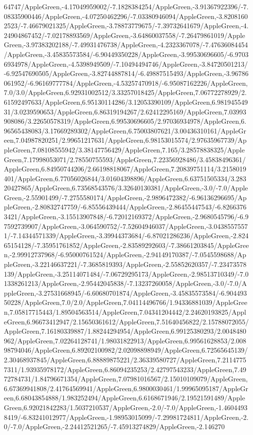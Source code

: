 {\begin{tikzternal}
64747/AppleGreen,-4.17049959002/-7.1828384254/AppleGreen,-3.91367922396/-7.08335900446/AppleGreen,-4.07250462296/-7.03380946094/AppleGreen,-3.82081602523/-7.46679021325/AppleGreen,-3.78873779675/-7.39732641679/AppleGreen,-4.24904867452/-7.02178893569/AppleGreen,-3.64860037558/-7.26479861019/AppleGreen,-3.97383202188/-7.49931476738/AppleGreen,-4.2323367078/-7.47636084454/AppleGreen,-3.45835573584/-6.90449350228/AppleGreen,-3.99530696605/-6.97036934978/AppleGreen,-4.5398949509/-7.10494494746/AppleGreen,-3.84720501213/-6.92547690505/AppleGreen,-3.82744887814/-6.49887515493/AppleGreen,-3.96786061952/-6.96169777784/AppleGreen,-4.53257470918/-6.95087162226/AppleGreen,7.0/3.0/AppleGreen,6.92931002512/3.33257018425/AppleGreen,7.06772278929/2.61592497633/AppleGreen,6.95130114286/3.12053390109/AppleGreen,6.98194554931/3.0239590653/AppleGreen,6.86319194267/2.62412295169/AppleGreen,7.03993908086/3.22650578319/AppleGreen,6.99530696605/2.97036934978/AppleGreen,6.96565438083/3.17669289302/AppleGreen,6.75003807621/3.00436310161/AppleGreen,7.04987820251/2.99651217631/AppleGreen,6.98153015574/2.97635967739/AppleGreen,7.08108555942/3.38147756429/AppleGreen,7.165/3.28578838325/AppleGreen,7.17998053071/2.78550755593/AppleGreen,7.22356928486/3.45838496361/AppleGreen,6.84950744206/2.66198818067/AppleGreen,7.20839751114/3.2158019401/AppleGreen,6.77056026844/3.01604398896/AppleGreen,6.63751505334/3.28320427865/AppleGreen,6.73568543576/3.32640130381/AppleGreen,-3.0/-7.0/AppleGreen,-2.55901499/-7.2755580174/AppleGreen,-2.9896472382/-6.96136296695/AppleGreen,-2.80832747759/-6.85556439444/AppleGreen,-2.86455447543/-6.82663763421/AppleGreen,-3.15513907848/-6.72012169372/AppleGreen,-2.9680545796/-6.97592739907/AppleGreen,-3.064590752/-7.52604946037/AppleGreen,-3.04385575571/-7.14344571339/AppleGreen,-3.39944373684/-6.87021286236/AppleGreen,-2.82465154128/-7.35951761852/AppleGreen,-2.83589292603/-7.38661203845/AppleGreen,-2.99912737968/-6.95000761524/AppleGreen,-2.94149170387/-7.0545598688/AppleGreen,-3.22146637221/-7.3685819393/AppleGreen,-2.55852620357/-7.23473578139/AppleGreen,-3.25114071484/-7.06729295173/AppleGreen,-2.98513710349/-7.01338261213/AppleGreen,-2.95442045838/-7.13237260058/AppleGreen,-3.0/-7.0/AppleGreen,-3.27531668945/-6.60680701874/AppleGreen,-3.45835573584/-6.90449350228/AppleGreen,7.0/2.0/AppleGreen,7.04114496766/1.94336881039/AppleGreen,7.05817715443/1.89504563514/AppleGreen,7.04341204442/2.24620193825/AppleGreen,6.96673412947/2.15650361612/AppleGreen,7.51640456822/2.15788072055/AppleGreen,7.16180339887/1.88244294954/AppleGreen,6.99125380293/2.0048480962/AppleGreen,7.02264128741/1.98031822913/AppleGreen,6.99561628853/2.00898794046/AppleGreen,6.89202100982/2.02098898949/AppleGreen,6.72565645139/2.30468937845/AppleGreen,6.88889875221/2.36339580727/AppleGreen,7.21147757311/1.93935978172/AppleGreen,6.86094235253/2.42797543233/AppleGreen,7.4972784731/1.84796671354/AppleGreen,7.07981016567/2.15010109079/AppleGreen,6.67369941808/2.41764569941/AppleGreen,6.9800030461/1.99965095187/AppleGreen,6.68043854888/1.983252494/AppleGreen,6.6168671946/2.19521591489/AppleGreen,6.92021842283/1.5037210537/AppleGreen,-2.0/-7.0/AppleGreen,-1.46044938419/-6.83241012977/AppleGreen,-1.98953015099/-7.29981724811/AppleGreen,-2.0/-7.0/AppleGreen,-2.24412521265/-7.45913274829/AppleGreen,-2.146270
\end{tikzternal}}
